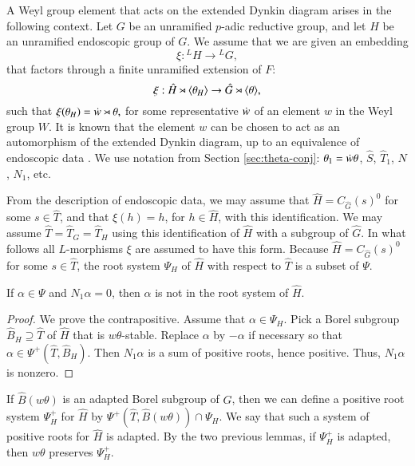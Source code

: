 A Weyl group element that acts on the extended Dynkin diagram arises
in the following context.  Let $G$ be an unramified $p$-adic reductive
group, and let $H$ be an unramified endoscopic group of $G$.  We
assume that we are given an embedding
\[
\xi:{}^LH\to {}^LG,
\]
that factors through a finite unramified extension of $F$:
\[
\xi:\hat H\rtimes \langle{\theta_H}\rangle\to \hat G\rtimes \langle{\theta}\rangle,
\]
such that $\xi(\theta_H) = \dot w \rtimes \theta,$ for some
representative $\dot w $ of an element $w$ in the Weyl group $W$.  It
is known that the element $w$ can be chosen 
to act as an automorphism of the extended Dynkin diagram,
up to an equivalence of endoscopic data
\cite[\S4.7]{hales1993simple}.  We
use notation from Section \ref{sec:theta-conj}: $\theta_1 = \dot w\theta$,
$\hat S$, $\hat T_1$, $N$, $N_1$, etc.

From the description of endoscopic data, we may assume that
$\hat H = C_{\hat G}(s)^0$ for some $s\in \hat T$, and that
$\xi(h) = h$, for $h \in \hat H$, with this identification.  We may
assume $\hat T = \hat T_G = \hat T_H$ using this identification of
$\hat H$ with a subgroup of $\hat G$.  In what follows all
$L$-morphisms $\xi$ are assumed to have this form.  Because
$\hat H = C_{\hat G}(s)^0$ for some $s\in \hat T$, the root system
$\Psi_H$ of $\hat H$ with respect to $\hat T$ is a subset of $\Psi$.

\begin{lemma}   If $\alpha\in \Psi$ and  $N_1\alpha=0$, then
$\alpha$ is not in the root system of $\hat H$.
\end{lemma}

\begin{proof} We prove the contrapositive.  Assume that $\alpha\in\Psi_H$.
Pick a Borel subgroup $\hat B_H\supseteq \hat T$ of $\hat H$ that
is $w\theta$-stable.  Replace $\alpha$ by $-\alpha$ if necessary so that 
$\alpha\in\Psi^+(\hat T,\hat B_H)$.  Then $N_1\alpha$ is a sum of positive roots,
hence positive.  Thus, $N_1\alpha$ is nonzero.
\end{proof}

If $\hat B(w\theta)$ is an adapted Borel subgroup of $\hat G$,
then we can define a positive root system $\Psi_H^+$ for $\hat H$ by
$\Psi^+(\hat T,\hat B(w\theta))\cap \Psi_H$.  We say that such a system of positive
roots for $\hat H$ is adapted.  By the two previous lemmas,
if $\Psi^+_H$ is adapted, then $w\theta$ preserves $\Psi^+_H$.

